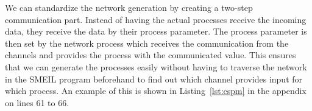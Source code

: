 


We can standardize the network generation by creating a two-step communication part. Instead of having the actual processes receive the incoming data, they receive the data by their process parameter. The process parameter is then set by the network process which receives the communication from the channels and provides the process with the communicated value.
This ensures that we can generate the processes easily without having to traverse the network in the SMEIL program beforehand to find out which channel provides input for which process. An example of this is shown in Listing~\ref{lst:cspm} in the appendix on lines 61 to 66.

